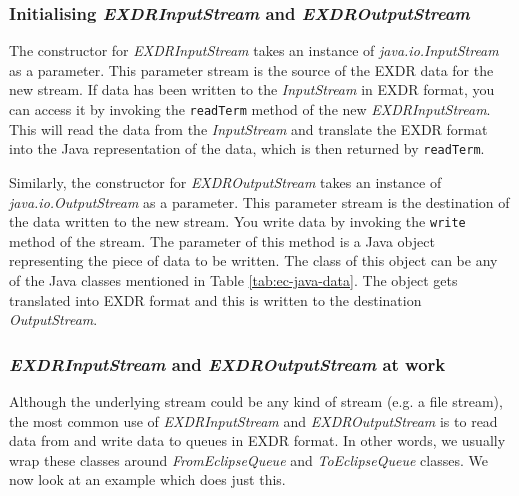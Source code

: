 \subsubsection*{Initialising {\it EXDRInputStream} and {\it EXDROutputStream}}
The constructor for {\it EXDRInputStream} takes an instance of {\it
java.io.InputStream} as a parameter. This parameter stream is the
source of the EXDR data for the new stream. If data has been written
to the {\it InputStream} in EXDR format, you can access it by invoking
the {\tt readTerm} method of the new {\it EXDRInputStream}. This
will read the data from the {\it InputStream} and translate the EXDR
format into the Java representation of the data, which is then
returned by {\tt readTerm}.

Similarly, the constructor for {\it EXDROutputStream} takes an
instance of {\it java.io.OutputStream} as a parameter. This parameter
stream is the destination of the data written to the new stream. You
write data by invoking the {\tt write} method of the stream. The
parameter of this method is a Java object representing the piece of
data to be written. The class of this object can be any of the Java
classes mentioned in Table \ref{tab:ec-java-data}. The object gets
translated into EXDR format and this is written to the destination
{\it OutputStream}.

\subsubsection*{{\it EXDRInputStream} and {\it EXDROutputStream} at work}
Although the underlying stream could be any kind of stream (e.g. a
file stream), the most common use of {\it EXDRInputStream} and {\it
EXDROutputStream} is to read data from and write data to queues in
EXDR format. In other words, we usually wrap these classes around {\it
FromEclipseQueue} and {\it ToEclipseQueue} classes. We now look at an
example which does just this.

